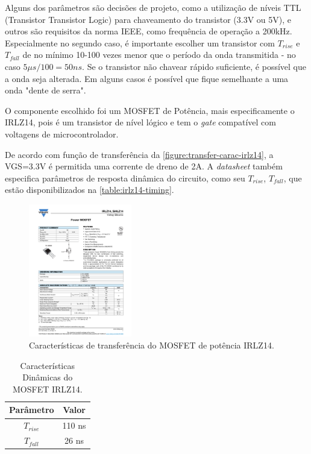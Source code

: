 	Alguns dos parâmetros são decisões de projeto, como a utilização de níveis TTL (Transistor Transistor Logic) para chaveamento do transistor (3.3V ou 5V), e outros são requisitos da norma IEEE, como frequência de operação a 200kHz. Especialmente no segundo caso, é importante escolher um transistor com $T_{rise}$ e $T_{fall}$ de no mínimo 10-100 vezes menor que o período da onda transmitida - no caso $5\mu$$s/100 = 50ns$. Se o transistor não chavear rápido suficiente, é possível que a onda seja alterada. Em alguns casos é possível que fique semelhante a uma onda "dente de serra".
	
	O componente escolhido foi um MOSFET de Potência, mais especificamente o IRLZ14, pois é um transistor de nível lógico e tem o \textit{gate} compatível com voltagens de microcontrolador. 

	De acordo com função de transferência da \autoref{figure:transfer-carac-irlz14}, a VGS=3.3V é permitida uma corrente de dreno de 2A. A \textit{datasheet} também especifica parâmetros de resposta dinâmica do circuito, como seu $T_{rise}$, $T_{fall}$, que estão disponibilizados na \autoref{table:irlz14-timing}.
	
	\begin{figure}[h]
		\caption{\label{figure:transfer-carac-irlz14}Características de transferência do MOSFET de potência IRLZ14.}
		\centering
		\includegraphics[page=3, width=0.4\textwidth, trim={12cm 16.5cm 2.2cm 5cm}, clip]{circuits/irlz14.pdf}
	\end{figure}

	\begin{table}[h]
		\caption{Características Dinâmicas do MOSFET IRLZ14.}
		\centering
		\begin{tabular}{c c}
			\hline
			Parâmetro  & Valor  \\ \hline
			$T_{rise}$ & 110 ns \\
			$T_{fall}$ & 26 ns  \\ \hline
		\end{tabular}
		\label{table:irlz14-timing}
	\end{table}

